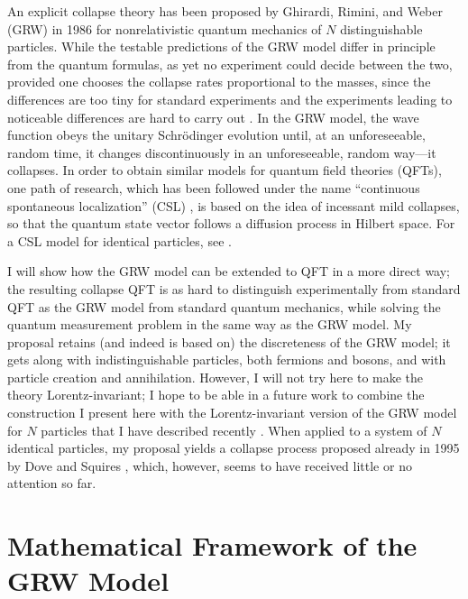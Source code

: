 \documentclass[12pt]{article}
\newcommand{\1}{1}
\newcommand{\z}[1]{{#1}}
\begin{document}
An explicit collapse theory has been proposed by Ghirardi, Rimini, and Weber (GRW) in 1986 \cite{grw} for nonrelativistic quantum mechanics of $N$ distinguishable particles. While the testable predictions of the GRW model differ in principle from the quantum formulas, as yet no experiment could decide between the two, \z{provided one chooses the collapse rates proportional to the masses,} since the differences are too tiny for standard experiments and the experiments leading to noticeable differences are hard to carry out \cite{BG03}. \z{In the GRW model, the wave function obeys the unitary Schr\"odinger evolution until, at an unforeseeable, random time, it changes discontinuously in an unforeseeable, random way---it collapses. In order to obtain similar models for quantum field theories (QFTs), one path of research, which has been followed under the name ``continuous spontaneous localization'' (CSL) \cite{Pe89,GPR90}, is based on the idea of incessant mild collapses, so that the quantum state vector follows a diffusion process in Hilbert space. For a CSL model for identical particles, see \cite{Pe89}.}

I will show how \z{the GRW model can be extended to QFT in a more direct way; the resulting collapse QFT} is as hard to distinguish experimentally from standard QFT as the GRW model from standard quantum mechanics, while solving the quantum measurement problem in the same way as the GRW model. My proposal retains (and indeed is based on) the discreteness of the GRW model; it gets along with indistinguishable particles, both fermions and bosons, and with particle creation and annihilation. However, I will not try here to make the theory Lorentz-invariant; I hope to be able in a future work to combine the construction I present here with the Lorentz-invariant version of the GRW model for $N$ particles that I have described recently \cite{Tum05}. \z{When applied to a system of $N$ identical particles, my proposal yields a collapse process proposed already in 1995 by Dove and Squires \cite{dovethesis,DS95}, which, however, seems to have received little or no attention so far.}





\section{Mathematical Framework of the GRW Model}
\end{document}
